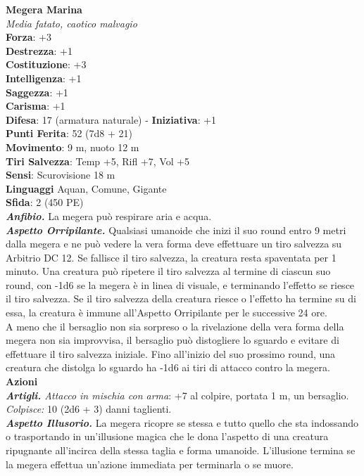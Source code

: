 \begin{multicols}{2}
\medskip\textbf{Megera Marina}\\
\emph{Media fatato, caotico malvagio}\\
\textbf{Forza}: +3\\
\textbf{Destrezza}: +1\\
\textbf{Costituzione}: +3\\
\textbf{Intelligenza}: +1\\
\textbf{Saggezza}: +1\\
\textbf{Carisma}: +1\\
\textbf{Difesa}: 17 (armatura naturale) - \textbf{Iniziativa}: +1\\
\textbf{Punti Ferita}: 52 (7d8 + 21)\\
\textbf{Movimento}: 9 m, nuoto 12 m\\
\textbf{Tiri Salvezza}: Temp +5, Rifl +7, Vol +5\\
\textbf{Sensi}: Scurovisione 18 m\\
\textbf{Linguaggi} Aquan, Comune, Gigante\\
\textbf{Sfida}: 2 (450 PE)\smallskip\\
\emph{\textbf{Anfibio.}} La megera può respirare aria e acqua.\\
\emph{\textbf{Aspetto Orripilante.}} Qualsiasi umanoide che inizi il suo round entro 9 metri dalla megera e ne può vedere la vera forma deve effettuare un tiro salvezza su Arbitrio DC  12. Se fallisce il tiro salvezza, la creatura resta spaventata per 1 minuto. Una creatura può ripetere il tiro salvezza al termine di ciascun suo round, con -1d6 se la megera è in linea di visuale, e terminando l'effetto se riesce il tiro salvezza. Se il tiro salvezza della creatura riesce o l'effetto ha termine su di essa, la creatura è immune all'Aspetto Orripilante per le successive 24 ore.\\
A meno che il bersaglio non sia sorpreso o la rivelazione della vera forma della megera non sia improvvisa, il bersaglio può distogliere lo sguardo e evitare di effettuare il tiro salvezza iniziale. Fino all'inizio del suo prossimo round, una creatura che distolga lo sguardo ha -1d6 ai tiri di attacco contro la megera.\\
\smallskip\textbf{Azioni}\\
\emph{\textbf{Artigli.} Attacco in mischia con arma}: +7 al colpire, portata 1 m, un bersaglio.\\
\emph{Colpisce:} 10 (2d6 + 3) danni taglienti.\\
\emph{\textbf{Aspetto Illusorio.}} La megera ricopre se stessa e tutto quello che sta indossando o trasportando in un'illusione magica che le dona l'aspetto di una creatura ripugnante all'incirca della stessa taglia e forma umanoide. L'illusione termina se la megera effettua un'azione immediata per terminarla o se muore.\\


\end{multicols}
